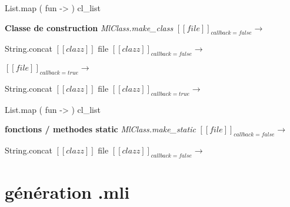 \documentclass[a4paper, 11pt]{report}
\begin{document}
\begin{OCaml}
     List.map ( fun ->  ) cl_list
\end{OCaml}

\textbf{Classe de construction}
\emph{MlClass.make\_class}
\newline
$[\![ file ]\!]_{callback=false}$$\longrightarrow$

String.concat $[\![ clazz ]\!]$ file
\newline
$[\![ clazz ]\!]_{callback=false}$$\longrightarrow$

\begin{OCaml}
     
\end{OCaml}
$[\![ file ]\!]_{callback=true}$$\longrightarrow$

String.concat $[\![ clazz ]\!]$ file
\newline
$[\![ clazz ]\!]_{callback=true}$$\longrightarrow$

\begin{OCaml}
     List.map ( fun ->  ) cl_list
\end{OCaml}
\textbf{fonctions / methodes static}
\emph{MlClass.make\_static}
\newline
$[\![ file ]\!]_{callback=false}$$\longrightarrow$

String.concat $[\![ clazz ]\!]$ file
\newline
$[\![ clazz ]\!]_{callback=false}$$\longrightarrow$

\begin{OCaml}
     
\end{OCaml}



\section{génération .mli}
 
\end{document}

